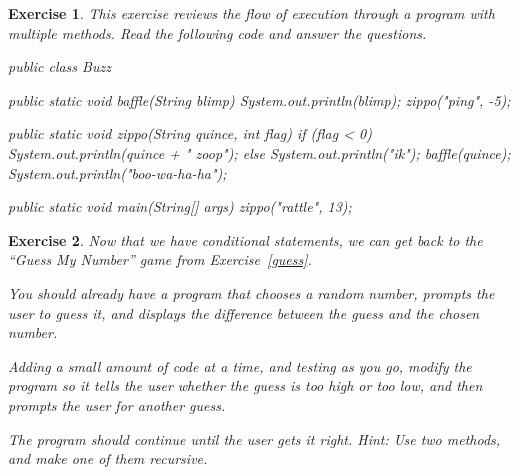\documentclass[12pt]{book}
\theoremstyle{exercise}
\newtheorem{exercise}{Exercise}[chapter]
\newcommand{\java}{\verb}%}
\begin{document}
\begin{exercise}

This exercise reviews the flow of execution through a program with multiple methods.
Read the following code and answer the questions.

\begin{code}
public class Buzz {

    public static void baffle(String blimp) {
        System.out.println(blimp);
        zippo("ping", -5);
    }

    public static void zippo(String quince, int flag) {
        if (flag < 0) {
            System.out.println(quince + " zoop");
        } else {
            System.out.println("ik");
            baffle(quince);
            System.out.println("boo-wa-ha-ha");
        }
    }

    public static void main(String[] args) {
        zippo("rattle", 13);
    }

}
\end{code}


\end{exercise}


\begin{exercise}

Now that we have conditional statements, we can get back to the ``Guess My Number'' game from Exercise~\ref{guess}.

You should already have a program that chooses a random number, prompts the user to guess it, and displays the difference between the guess and the chosen number.

Adding a small amount of code at a time, and testing as you go, modify the program so it tells the user whether the guess is too high or too low, and then prompts the user for another guess.

The program should continue until the user gets it right.
{\em Hint:} Use two methods, and make one of them recursive.

\end{exercise}
\end{document}

